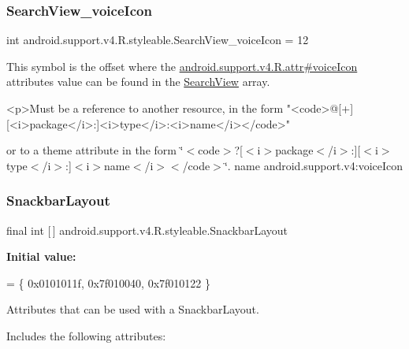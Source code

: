 \subsubsection{\texorpdfstring{Search\+View\+\_\+voice\+Icon}{SearchView\_voiceIcon}}
{\footnotesize\ttfamily int android.\+support.\+v4.\+R.\+styleable.\+Search\+View\+\_\+voice\+Icon = 12\hspace{0.3cm}{\ttfamily [static]}}

This symbol is the offset where the \hyperlink{classandroid_1_1support_1_1v4_1_1R_1_1attr_ad22fdc68658d936869e5756cda1b2d6f}{android.\+support.\+v4.\+R.\+attr\#voice\+Icon} attribute\textquotesingle{}s value can be found in the \hyperlink{classandroid_1_1support_1_1v4_1_1R_1_1styleable_a7f709410d566e9fd5d4c710e815c300a}{Search\+View} array.

\begin{DoxyVerb}      <p>Must be a reference to another resource, in the form "<code>@[+][<i>package</i>:]<i>type</i>:<i>name</i></code>"
\end{DoxyVerb}
 or to a theme attribute in the form \char`\"{}$<$code$>$?\mbox{[}$<$i$>$package$<$/i$>$\+:\mbox{]}\mbox{[}$<$i$>$type$<$/i$>$\+:\mbox{]}$<$i$>$name$<$/i$>$$<$/code$>$\char`\"{}.  name android.\+support.\+v4\+:voice\+Icon \mbox{\label{classandroid_1_1support_1_1v4_1_1R_1_1styleable_adeacc34656ceb21bac2e2f80c4437fbc}} 
\subsubsection{\texorpdfstring{Snackbar\+Layout}{SnackbarLayout}}
{\footnotesize\ttfamily final int \mbox{[}$\,$\mbox{]} android.\+support.\+v4.\+R.\+styleable.\+Snackbar\+Layout\hspace{0.3cm}{\ttfamily [static]}}

{\bfseries Initial value\+:}
\begin{DoxyCode}
= \{
            0x0101011f, 0x7f010040, 0x7f010122
        \}
\end{DoxyCode}
Attributes that can be used with a Snackbar\+Layout. 

Includes the following attributes\+:

